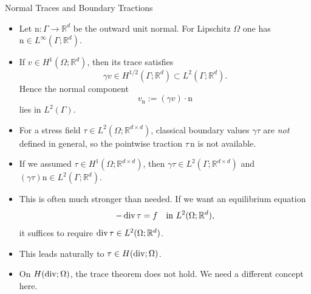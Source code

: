 \documentclass[10pt,aspectratio=169]{beamer}
\def\R{{\mathbb R}}
\newcommand{\diver}{\operatornamewithlimits{div}}
\begin{document}
\begin{frame}{Normal Traces and Boundary Tractions}
	\begin{itemize}
		\item Let $\mathrm{n}:\Gamma\to\R^d$ be the outward unit normal. For Lipschitz $\Omega$ one has $\mathrm{n}\in L^\infty(\Gamma;\R^d)$.
		\item If $v\in H^1(\Omega;\R^d)$, then its trace satisfies
		      \begin{equation*}
			      \gamma v\in H^{1/2}(\Gamma;\R^d)\subset L^2(\Gamma;\R^d).
		      \end{equation*}
		      Hence the normal component
		      \begin{equation*}
			      v_{\mathrm n}:=(\gamma v)\cdot \mathrm n
		      \end{equation*}
		      lies in $L^2(\Gamma)$.
		\item For a stress field $\tau\in L^2(\Omega;\R^{d\times d})$, classical boundary values $\gamma\tau$ are \emph{not} defined in general, so the pointwise traction $\tau\,\mathrm n$ is not available.
		\item If we assumed $\tau\in H^1(\Omega;\R^{d\times d})$, then $\gamma\tau\in L^2(\Gamma;\R^{d\times d})$ and $(\gamma\tau)\mathrm n\in L^2(\Gamma;\R^d)$.
		\item This is often much stronger than needed. If we want an equilibrium equation
		      \begin{equation*}
			      -\diver\tau = f \quad\text{in }L^2(\Omega;\R^d),
		      \end{equation*}
		      it suffices to require $\diver\tau\in L^2(\Omega;\R^d)$.
		\item This leads naturally to $\tau\in H(\diver;\Omega)$.
		\item On $H(\diver;\Omega)$, the trace theorem does not hold. We need a different concept here.
	\end{itemize}
\end{frame}
\end{document}
